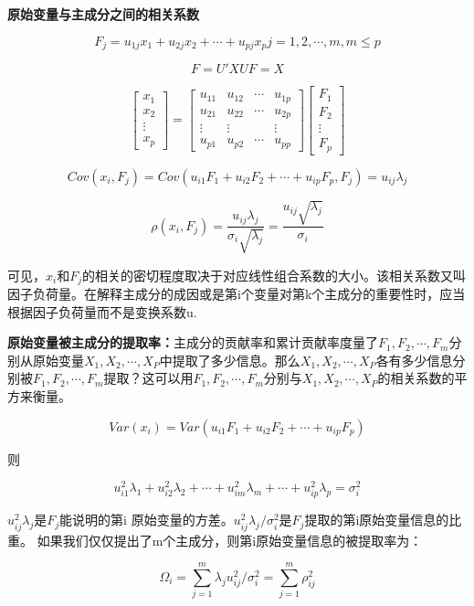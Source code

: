 \documentclass[]{ctexbook}
\begin{document}
\textbf{原始变量与主成分之间的相关系数}

\[F_j=u_{1j}x_1+u_{2j}x_2+\cdots+u_{pj}x_p j=1,2,\cdots,m,m\le p\]

\[F=U'X UF=X\]

\[\begin {bmatrix} x_1 \\ x_2 \\ \vdots \\ x_p \end {bmatrix}=\begin {bmatrix} u_{11} & u_{12} & \cdots & u_{1p} \\ u_{21} & u_{22} & \cdots & u_{2p} \\ \vdots & \vdots & & \vdots \\ u_{p1} & u_{p2} & \cdots & u_{pp} \end {bmatrix}\begin {bmatrix} F_1 \\ F_2 \\ \vdots \\ F_p \end {bmatrix}\]

\[Cov(x_i,F_j)=Cov(u_{i1}F_1+u_{i2}F_2+\cdots+u_{ip}F_p,F_j)=u_{ij}\lambda_j\]

\[\rho(x_i,F_j)=\frac{u_{ij}\lambda_j}{\sigma_i\sqrt{\lambda_j}}=\frac{u_{ij}\sqrt{\lambda_j}}{\sigma_i}\]

可见，\(x_i\)和\(F_j\)的相关的密切程度取决于对应线性组合系数的大小。该相关系数又叫因子负荷量。在解释主成分的成因或是第i个变量对第k个主成分的重要性时，应当根据因子负荷量而不是变换系数u.

\textbf{原始变量被主成分的提取率：}主成分的贡献率和累计贡献率度量了\(F_1,F_2,\cdots,F_m\)分别从原始变量\(X_1,X_2,\cdots,X_P\)中提取了多少信息。那么\(X_1,X_2, \cdots,X_P\)各有多少信息分别被\(F_1,F_2,\cdots,F_m\)提取？这可以用\(F_1,F_2,\cdots,F_m\)分别与\(X_1, X_2,\cdots,X_P\)的相关系数的平方来衡量。

\[Var(x_i)=Var(u_{i1}F_1+u_{i2}F_2+\cdots+u_{ip}F_p)\]

则

\[u_{i1}^2\lambda_1+u_{i2}^2\lambda_2+\cdots+u_{im}^2\lambda_m+\cdots+u_{ip}^2\lambda_p=\sigma_i^2\]

\(u_{ij}^2\lambda_j\)是\(F_j\)能说明的第i 原始变量的方差。\(u_{ij}^2\lambda_j/\sigma_i^2\)是\(F_j\)提取的第i原始变量信息的比重。
如果我们仅仅提出了m个主成分，则第i原始变量信息的被提取率为：

\[\Omega_i=\sum_{j=1}^m\lambda_ju_{ij}^2/\sigma_i^2=\sum_{j=1}^m\rho_{ij}^2\]
\end{document}
